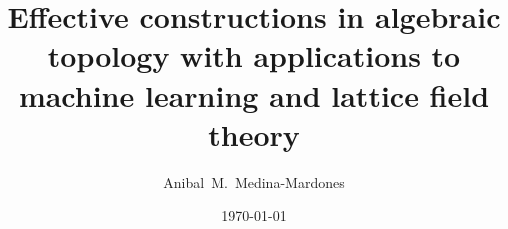 \documentclass{amsart}
\title[Effective constructions in algebraic topology]{Effective constructions in algebraic topology with applications to machine learning and lattice field theory}
\author[A.~Medina-Mardones]{Anibal~M.~Medina-Mardones}
\date{\today}
\begin{document}
	
	\maketitle
	
	
	
	
	\sloppy
	\printbibliography
\end{document}
